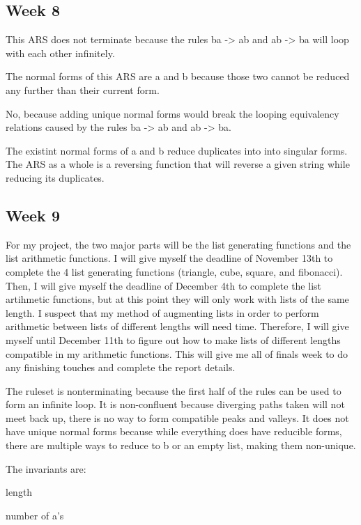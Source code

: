 \documentclass{article}
\theoremstyle{theorem}
\theoremstyle{definition}
\theoremstyle{remark}
\begin{document}
\subsection{Week 8}
This ARS does not terminate because the rules ba -> ab and ab -> ba will loop with each other infinitely.

\medskip\noindent
The normal forms of this ARS are a and b because those two cannot be reduced any further than their current form.

\medskip\noindent
No, because adding unique normal forms would break the looping equivalency relations caused by the rules ba -> ab and ab -> ba.

\medskip\noindent
The existint normal forms of a and b reduce duplicates into into singular forms. The ARS as a whole is a reversing function that will reverse a given string while reducing its duplicates.

\subsection{Week 9}
For my project, the two major parts will be the list generating functions and the list arithmetic functions. I will give myself the deadline of November 13th to complete the 4 list generating functions (triangle, cube, square, and fibonacci). Then, I will give myself the deadline of December 4th to complete the list artihmetic functions, but at this point they will only work with lists of the same length. I suspect that my method of augmenting lists in order to perform arithmetic between lists of different lengths will need time. Therefore, I will give myself until December 11th to figure out how to make lists of different lengths compatible in my arithmetic functions. This will give me all of finals week to do any finishing touches and complete the report details.

\medskip\noindent
The ruleset is nonterminating because the first half of the rules can be used to form an infinite loop. It is non-confluent because diverging paths taken will not meet back up, there is no way to form compatible peaks and valleys. It does not have unique normal forms because while everything does have reducible forms, there are multiple ways to reduce to b or an empty list, making them non-unique.

\medskip\noindent
The invariants are:

\medskip\noindent
length

\medskip\noindent
number of a's
\end{document}
